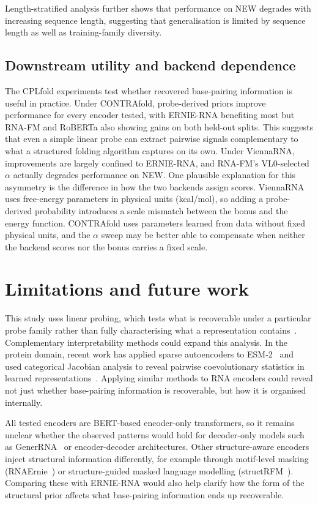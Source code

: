 \documentclass[logo,bsc,singlespacing,parskip]{infthesis}
\begin{document}
Length-stratified analysis further shows that performance on NEW degrades with increasing sequence length, suggesting that generalisation is limited by sequence length as well as training-family diversity.

\subsection{Downstream utility and backend dependence}
\label{sec:disc_utility}
The CPLfold experiments test whether recovered base-pairing information is useful in practice. Under CONTRAfold, probe-derived priors improve performance for every encoder tested, with ERNIE-RNA benefiting most but RNA-FM and RoBERTa also showing gains on both held-out splits.
This suggests that even a simple linear probe can extract pairwise signals complementary to what a structured folding algorithm captures on its own.
Under ViennaRNA, improvements are largely confined to ERNIE-RNA, and RNA-FM's VL0-selected $\alpha$ actually degrades performance on NEW. 
One plausible explanation for this asymmetry is the difference in how the two backends assign scores. ViennaRNA uses free-energy parameters in physical units (kcal/mol), so adding a probe-derived probability introduces a scale mismatch between the bonus and the energy function. 
CONTRAfold uses parameters learned from data without fixed physical units, and the $\alpha$ sweep may be better able to compensate when neither the backend scores nor the bonus carries a fixed scale.

\section{Limitations and future work}
\label{sec:limitations}
This study uses linear probing, which tests what is recoverable under a particular probe family rather than fully characterising what a representation contains~\citep{hewitt2019structural, chowdhury2024probing}. Complementary interpretability methods could expand this analysis. In the protein domain, recent work has applied sparse autoencoders to ESM-2~\citep{simon2025interplm, adams2025mechanistic} and used categorical Jacobian analysis to reveal pairwise coevolutionary statistics in learned representations~\citep{zhang2024plm}. Applying similar methods to RNA encoders could reveal not just whether base-pairing information is recoverable, but how it is organised internally.

All tested encoders are BERT-based encoder-only transformers, so it remains unclear whether the observed patterns would hold for decoder-only models such as GenerRNA~\citep{zhao2024generrna} or encoder-decoder architectures. Other structure-aware encoders inject structural information differently, for example through motif-level masking (RNAErnie~\citep{wang2024rnaernie}) or structure-guided masked language modelling (structRFM~\citep{zhu2025structrfm}). Comparing these with ERNIE-RNA would also help clarify how the form of the structural prior affects what base-pairing information ends up recoverable.
\end{document}
